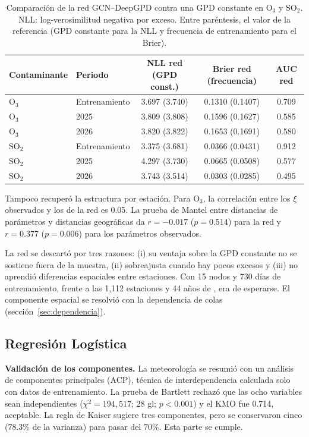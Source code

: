 \documentclass[11pt]{article}
\begin{document}
\begin{table}[!htbp]
\centering
\caption{Comparación de la red GCN--DeepGPD contra una GPD constante en O$_3$ y SO$_2$. NLL: log-verosimilitud negativa por exceso. Entre paréntesis, el valor de la referencia (GPD constante para la NLL y frecuencia de entrenamiento para el Brier).}
\label{tab:gcn}
\small
\begin{tabular}{llccc}
\toprule
Contaminante & Periodo & NLL red (GPD const.) & Brier red (frecuencia) & AUC red \\
\midrule
O$_3$  & Entrenamiento & 3.697 (3.740) & 0.1310 (0.1407) & 0.709 \\
O$_3$  & 2025          & 3.809 (3.808) & 0.1596 (0.1627) & 0.585 \\
O$_3$  & 2026          & 3.820 (3.822) & 0.1653 (0.1691) & 0.580 \\
SO$_2$ & Entrenamiento & 3.375 (3.681) & 0.0366 (0.0431) & 0.912 \\
SO$_2$ & 2025          & 4.297 (3.730) & 0.0665 (0.0508) & 0.577 \\
SO$_2$ & 2026          & 3.743 (3.514) & 0.0303 (0.0285) & 0.495 \\
\bottomrule
\end{tabular}
\end{table}

Tampoco recuperó la estructura por estación. Para O$_3$, la correlación entre los $\xi$ observados y los de la red es 0.05. La prueba de Mantel entre distancias de parámetros y distancias geográficas da $r=-0.017$ ($p=0.514$) para la red y $r=0.377$ ($p=0.006$) para los parámetros observados.

La red se descartó por tres razones: (i) su ventaja sobre la GPD constante no se sostiene fuera de la muestra, (ii) sobreajusta cuando hay pocos excesos y (iii) no aprendió diferencias espaciales entre estaciones. Con 15 nodos y 730 días de entrenamiento, frente a las 1,112 estaciones y 44 años de \citet{wilson2022deepgpd}, era de esperarse. El componente espacial se resolvió con la dependencia de colas (sección~\ref{sec:dependencia}).


\subsection{Regresión Logística}
\label{sec:val-logit}
\textbf{Validación de los componentes.} La meteorología se resumió con un análisis de componentes principales (ACP), técnica de interdependencia calculada solo con datos de entrenamiento. La prueba de Bartlett rechazó que las ocho variables sean independientes ($\chi^2=194{,}517$; 28 gl; $p<0.001$) y el KMO fue 0.714, aceptable. La regla de Kaiser sugiere tres componentes, pero se conservaron cinco (78.3\% de la varianza) para pasar del 70\%. Esta parte se cumple.
\end{document}
